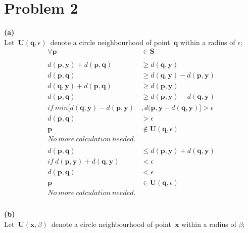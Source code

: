 \documentclass[11pt]{scrartcl}
\begin{document}
\section*{Problem 2}
\textbf{(a)}\\
Let\ $ \bm{U}(\bm{q},\epsilon)$\ denote a circle neighbourhood of point\ $ \bm{q}$ within a radius of  $\epsilon$;\\
\begin{equation*}
\begin{aligned}
\forall \bm{p}&\in \bm{S}\\
\\
d(\bm{p},\bm{y})+d(\bm{p},\bm{q})&\geq d(\bm{q},\bm{y})\\
d(\bm{p},\bm{q})& \geq d(\bm{q},\bm{y})-d(\bm{p},\bm{y})\\
d(\bm{q},\bm{y})+d(\bm{p},\bm{q})&\geq d(\bm{p},\bm{y})\\
d(\bm{p},\bm{q})&\geq d(\bm{p},\bm{y})-d(\bm{q},\bm{y})\\
if \ min[d(\bm{q},\bm{y})-d(\bm{p},\bm{y})&, d(\bm{p},\bm{y}-d(\bm{q},\bm{y})] >\epsilon\\
d(\bm{p},\bm{q})&>\epsilon\\
\bm{p} &\notin \bm{U}(\bm{q},\epsilon)\\
No\ more\ calculation\ needed.\\
\\
d(\bm{p},\bm{q})&\leq d(\bm{p},\bm{y})+d(\bm{q},\bm{y})\\
 if \ d(\bm{p},\bm{y})+d(\bm{q},\bm{y})&< \epsilon\\
d(\bm{p},\bm{q})& < \epsilon\\
\bm{p} &\in \bm{U}(\bm{q},\epsilon)\\
No\ more\ calculation\ needed.\\
\end{aligned}
\end{equation*}
\\
\textbf{(b)}\\
Let\ $ \bm{U}(\bm{x},\beta)$\ denote a circle neighbourhood of point\ $ \bm{x}$ within a radius of  $\beta$;\\
\end{document}
